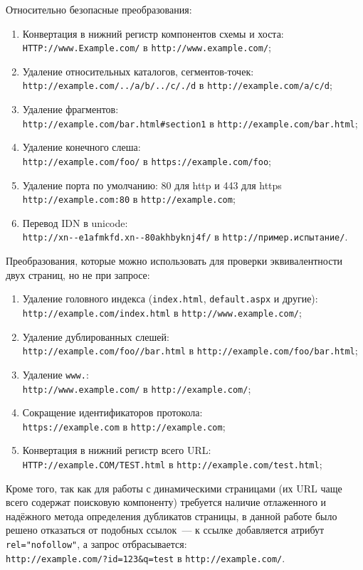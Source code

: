 Относительно безопасные преобразования:
\begin{enumerate}
  \item Конвертация в нижний регистр компонентов схемы и хоста: \\ \verb|HTTP://www.Example.com/| в \verb|http://www.example.com/|;
  \item Удаление относительных каталогов, сегментов-точек: \\ \verb|http://example.com/../a/b/../c/./d| в \verb|http://example.com/a/c/d|;
  \item Удаление фрагментов: \\ \verb|http://example.com/bar.html#section1| в \verb|http://example.com/bar.html|;
  \item Удаление конечного слеша: \\ \verb|http://example.com/foo/| в \verb|https://example.com/foo|;
  \item Удаление порта по умолчанию: 80 для http и 443 для https \\ \verb|http://example.com:80| в \verb|http://example.com|;
  \item Перевод IDN в unicode: \\ \verb|http://xn--e1afmkfd.xn--80akhbyknj4f/| в \verb|http://пример.испытание/|.
\end{enumerate}

Преобразования, которые можно использовать для проверки эквивалентности двух страниц, но не при запросе:
\begin{enumerate}
  \item Удаление головного индекса (\verb|index.html|, \verb|default.aspx| и другие): \\ \verb|http://example.com/index.html| в \verb|http://www.example.com/|;
  \item Удаление дублированных слешей: \\ \verb|http://example.com/foo//bar.html| в \verb|http://example.com/foo/bar.html|;
  \item Удаление \verb|www.|: \\ \verb|http://www.example.com/| в \verb|http://example.com/|;
  \item Сокращение идентификаторов протокола: \\ \verb|https://example.com| в \verb|http://example.com|;
  \item Конвертация в нижний регистр всего URL: \\ \verb|HTTP://example.COM/TEST.html| в \verb|http://example.com/test.html|;
\end{enumerate}

Кроме того, так как для работы с динамическими страницами (их URL чаще всего содержат поисковую компоненту) требуется наличие отлаженного и надёжного метода определения дубликатов страницы, в данной работе было решено отказаться от подобных ссылок~--- к ссылке добавляется атрибут \verb|rel="nofollow"|, а запрос отбрасывается: \\ \verb|http://example.com/?id=123&q=test| в \verb|http://example.com/|.
